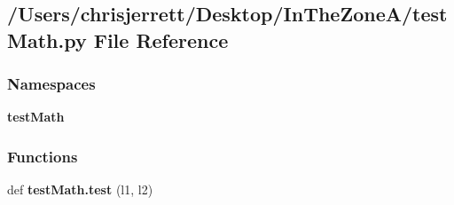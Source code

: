 \subsection{/\+Users/chrisjerrett/\+Desktop/\+In\+The\+Zone\+A/test\+Math.py File Reference}
\label{test_math_8py}
\subsubsection*{Namespaces}
\begin{DoxyCompactItemize}
\item 
 \textbf{ test\+Math}
\end{DoxyCompactItemize}
\subsubsection*{Functions}
\begin{DoxyCompactItemize}
\item 
def \textbf{ test\+Math.\+test} (l1, l2)
\end{DoxyCompactItemize}
